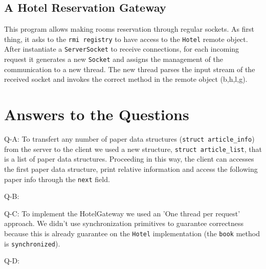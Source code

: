 \subsection{A Hotel Reservation Gateway}
This program allows making rooms reservation through regular sockets. As first thing, it asks to the \texttt{rmi registry} to have access to the \texttt{Hotel} remote object. After instantiate a  \texttt{ServerSocket} to receive connections, for each incoming request it generates a new \texttt{Socket} and assigns the management of the communication to a new thread. The new thread parses the input stream of the received socket and invokes the correct method in the remote object (b,h,l,g).

\section{Answers to the Questions}
Q-A: To transfert any number of paper data structures (\texttt{struct article\_info}) from the server to the client we used a new structure, \texttt{struct article\_list}, that is a list of paper data structures. Proceeding in this way, the client can accesses the first paper data structure, print relative information and access the following paper info through the \texttt{next} field.

Q-B: 

Q-C: To implement the HotelGateway we used an 'One thread per request' approach. We didn't use synchronization primitives to guarantee correctness because this is already guarantee on the \texttt{Hotel} implementation (the \texttt{book} method is \texttt{synchronized}).

Q-D:


